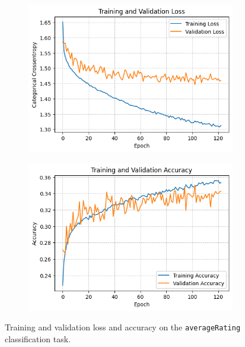 \begin{figure}[H]
    \centering
    \begin{subfigure}[b]{0.49\textwidth}
        \centering
        \includegraphics[width=\textwidth]{plotsss/loss_rating.png}
        \label{fig:loss_nn_rating}
    \end{subfigure}
    \hfill
    \begin{subfigure}[b]{0.49\textwidth}
        \centering
        \includegraphics[width=\textwidth]{plotsss/accuracy_rating.png}
        \label{fig:accuracy_nn_rating}
    \end{subfigure}
    \caption{Training and validation loss and accuracy on the \texttt{averageRating} classification task.}
    \label{fig:nn_performance_rating}
\end{figure}

